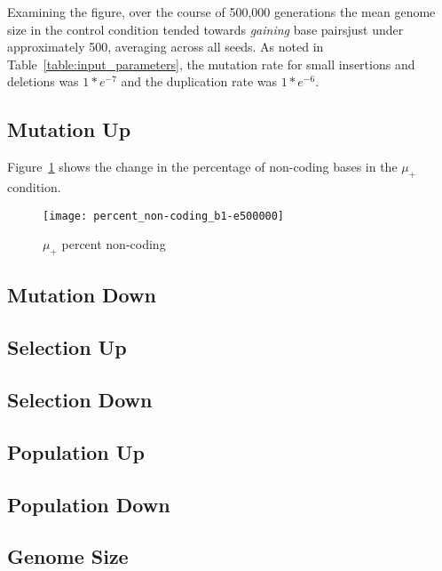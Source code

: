 Examining the figure, over the course of 500,000 generations the mean genome size in the control condition tended towards \textit{gaining} base pairs\textemdash just under approximately 500, averaging across all seeds. As noted in Table~\ref{table:input_parameters}, the mutation rate for small insertions and deletions was $1*e^{-7}$ and the duplication rate was $1*e^{-6}$. 




\subsection{Mutation Up}
Figure~\ref{fig:mut_up_percent_non-coding} shows the change in the percentage of non-coding bases in the $\mu_+$ condition. 

\begin{figure}[H]
	\centering
	\texttt{[image: percent\_non-coding\_b1-e500000]}
	\caption[Mutation up - percent non-coding]{$\mu_+$ percent non-coding}
	\label{fig:mut_up_percent_non-coding}
\end{figure}
\subsection{Mutation Down}
\subsection{Selection Up}
\subsection{Selection Down}
\subsection{Population Up}
\subsection{Population Down}

\subsection{Genome Size}\label{sec:genome_size}

